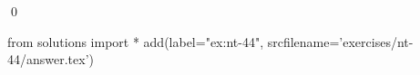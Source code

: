 
\begin{ex} 
  \label{ex:nt-44}
  
  \qed
\end{ex} 
\begin{python0}
from solutions import *
add(label="ex:nt-44",
    srcfilename='exercises/nt-44/answer.tex') 
\end{python0}
